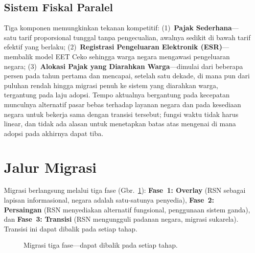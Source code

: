 \documentclass[11pt,a4paper,twocolumn]{article}
\begin{document}
\subsection{Sistem Fiskal Paralel}

Tiga komponen memungkinkan tekanan kompetitif: (1)~\textbf{Pajak Sederhana}---satu tarif proporsional tunggal tanpa pengecualian, awalnya sedikit di bawah tarif efektif yang berlaku; (2)~\textbf{Registrasi Pengeluaran Elektronik (ESR)}---membalik model EET Ceko sehingga warga negara mengawasi pengeluaran negara; (3)~\textbf{Alokasi Pajak yang Diarahkan Warga}---dimulai dari beberapa persen pada tahun pertama dan mencapai, setelah satu dekade, di mana pun dari puluhan rendah hingga migrasi penuh ke sistem yang diarahkan warga, tergantung pada laju adopsi. Tempo aktualnya bergantung pada kecepatan munculnya alternatif pasar bebas terhadap layanan negara dan pada kesediaan negara untuk bekerja sama dengan transisi tersebut; fungsi waktu tidak harus linear, dan tidak ada alasan untuk menetapkan batas atas mengenai di mana adopsi pada akhirnya dapat tiba.

\section{Jalur Migrasi}

Migrasi berlangsung melalui tiga fase (Gbr.~\ref{fig:migration}): \textbf{Fase~1: Overlay} (RSN sebagai lapisan informasional, negara adalah satu-satunya penyedia), \textbf{Fase~2: Persaingan} (RSN menyediakan alternatif fungsional, penggunaan sistem ganda), dan \textbf{Fase~3: Transisi} (RSN mengungguli padanan negara, migrasi sukarela). Transisi ini dapat dibalik pada setiap tahap.

\begin{figure}[ht]
\centering
{}
\caption{Migrasi tiga fase---dapat dibalik pada setiap tahap.}
\label{fig:migration}
\end{figure}
\end{document}
